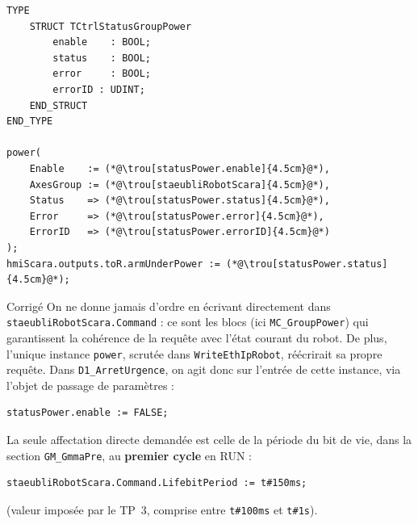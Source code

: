 \begin{UPSTIactivite}

\begin{lstlisting}
TYPE
    STRUCT TCtrlStatusGroupPower
        enable    : BOOL;
        status    : BOOL;
        error     : BOOL;
        errorID : UDINT;
    END_STRUCT
END_TYPE

power(
    Enable    := (*@\trou[statusPower.enable]{4.5cm}@*),
    AxesGroup := (*@\trou[staeubliRobotScara]{4.5cm}@*),
    Status    => (*@\trou[statusPower.status]{4.5cm}@*),
    Error     => (*@\trou[statusPower.error]{4.5cm}@*),
    ErrorID   => (*@\trou[statusPower.errorID]{4.5cm}@*)
);
hmiScara.outputs.toR.armUnderPower := (*@\trou[statusPower.status]{4.5cm}@*);
\end{lstlisting}


\begin{UPSTIcorrectionP}{Corrigé}
On ne donne jamais d'ordre en écrivant directement dans
\texttt{staeubliRobotScara.Command} : ce sont les blocs (ici
\texttt{MC\_GroupPower}) qui garantissent la cohérence de la requête avec
l'état courant du robot. De plus, l'unique instance
\texttt{power}, scrutée dans \texttt{WriteEthIpRobot}, réécrirait
sa propre requête. Dans \texttt{D1\_ArretUrgence}, on agit donc sur
l'entrée de cette instance, via l'objet de passage de paramètres :
\begin{lstlisting}
statusPower.enable := FALSE;
\end{lstlisting}
La seule affectation directe demandée est celle de la période du bit de
vie, dans la section \texttt{GM\_GmmaPre}, au \textbf{premier cycle} en
RUN :
\begin{lstlisting}
staeubliRobotScara.Command.LifebitPeriod := t#150ms;
\end{lstlisting}
(valeur imposée par le TP~3, comprise entre \texttt{t\#100ms} et
\texttt{t\#1s}).
\end{UPSTIcorrectionP}


\end{UPSTIactivite}
